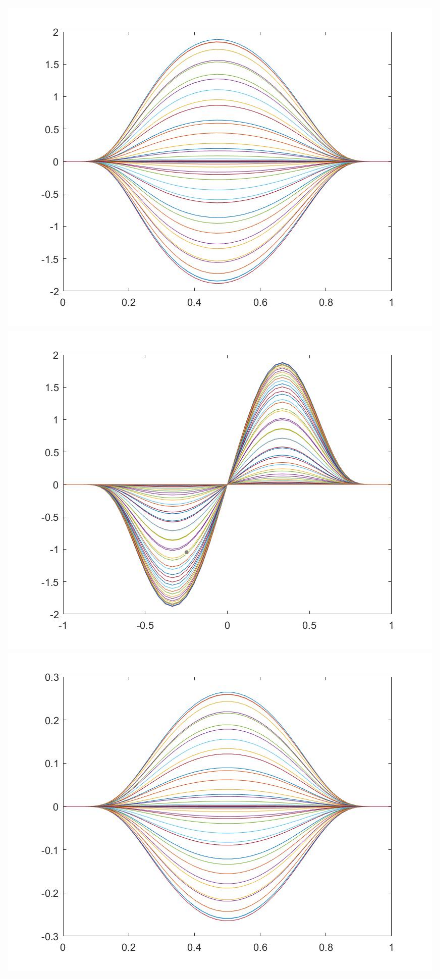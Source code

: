\documentclass[11pt, a4paper]{article}
\theoremstyle{definition}
\begin{document}
\begin{figure}[h]
	\includegraphics[scale=0.3]{PerttxD1.jpg}
	\includegraphics[scale=0.3]{PerttxD2.jpg}\\
	\includegraphics[scale=0.3]{PerttxD3.jpg}

\end{figure}
\end{document}
